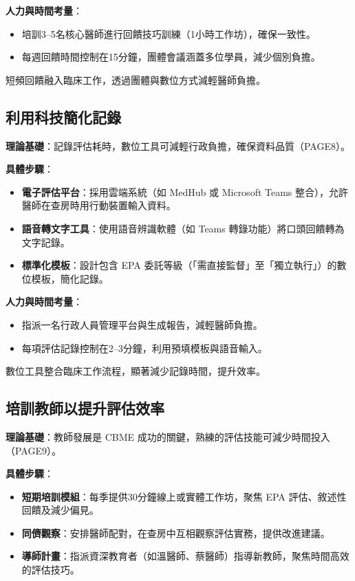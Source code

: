 \documentclass[12pt,a4paper]{article}
\newcommand{\note}[1]{
    \par
    \noindent
    \begin{tcolorbox}[
        colback=emergency_blue!5!white,
        colframe=emergency_blue,
        title=\textbf{重點提醒},
        fonttitle=\bfseries,
        boxrule=0.5pt,
        arc=3pt,
        left=6pt,
        right=6pt,
        top=6pt,
        bottom=6pt
    ]
    #1
    \end{tcolorbox}
}
\begin{document}
\textbf{人力與時間考量}：
\begin{itemize}[nosep]
    \item 培訓3–5名核心醫師進行回饋技巧訓練（1小時工作坊），確保一致性。
    \item 每週回饋時間控制在15分鐘，團體會議涵蓋多位學員，減少個別負擔。
\end{itemize}

\vspace{0.5cm}
\note{
短頻回饋融入臨床工作，透過團體與數位方式減輕醫師負擔。
}

\subsection{利用科技簡化記錄}
\textbf{理論基礎}：記錄評估耗時，數位工具可減輕行政負擔，確保資料品質（PAGE8）。

\textbf{具體步驟}：
\begin{itemize}[nosep]
    \item \textbf{電子評估平台}：採用雲端系統（如 MedHub 或 Microsoft Teams 整合），允許醫師在查房時用行動裝置輸入資料。
    \item \textbf{語音轉文字工具}：使用語音辨識軟體（如 Teams 轉錄功能）將口頭回饋轉為文字記錄。
    \item \textbf{標準化模板}：設計包含 EPA 委託等級（「需直接監督」至「獨立執行」）的數位模板，簡化記錄。
\end{itemize}

\textbf{人力與時間考量}：
\begin{itemize}[nosep]
    \item 指派一名行政人員管理平台與生成報告，減輕醫師負擔。
    \item 每項評估記錄控制在2–3分鐘，利用預填模板與語音輸入。
\end{itemize}

\vspace{0.5cm}
\note{
數位工具整合臨床工作流程，顯著減少記錄時間，提升效率。
}

\subsection{培訓教師以提升評估效率}
\textbf{理論基礎}：教師發展是 CBME 成功的關鍵，熟練的評估技能可減少時間投入（PAGE9）。

\textbf{具體步驟}：
\begin{itemize}[nosep]
    \item \textbf{短期培訓模組}：每季提供30分鐘線上或實體工作坊，聚焦 EPA 評估、敘述性回饋及減少偏見。
    \item \textbf{同儕觀察}：安排醫師配對，在查房中互相觀察評估實務，提供改進建議。
    \item \textbf{導師計畫}：指派資深教育者（如溫醫師、蔡醫師）指導新教師，聚焦時間高效的評估技巧。
\end{itemize}
\end{document}
